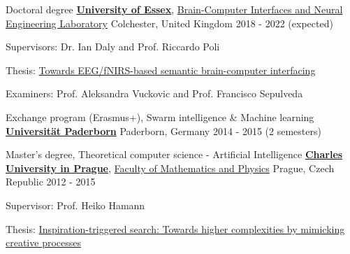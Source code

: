 

\begin{cventries}

  \cventry
    {Doctoral degree} %
    {\href{https://www.essex.ac.uk}{\textbf{University of Essex}}, \href{http://essexbcis.uk}{Brain-Computer Interfaces and Neural Engineering Laboratory}} %
    {Colchester, United Kingdom} %
    {2018 - 2022 (expected)} %
    {
      \begin{cvitems} %
        \item {Supervisors: Dr. Ian Daly and Prof. Riccardo Poli}
        \item {Thesis: \href{http://milanrybar.cz/semantic-brain-computer-interfacing}{Towards EEG/fNIRS-based semantic brain-computer interfacing}}
        \item {Examiners: Prof. Aleksandra Vuckovic and Prof. Francisco Sepulveda}
      \end{cvitems}
    }

  \cventry
{Exchange program (Erasmus+), Swarm intelligence \& Machine learning} %
{\href{http://www.uni-paderborn.de}{\textbf{Universität Paderborn}}} %
{Paderborn, Germany} %
{2014 - 2015 (2 semesters)} %
{
}

  \cventry
{Master's degree, Theoretical computer science - Artificial Intelligence} %
{\href{http://cuni.cz}{\textbf{Charles University in Prague}}, \href{http://www.mff.cuni.cz}
	{Faculty of Mathematics and Physics}} %
{Prague, Czech Republic} %
{2012 - 2015} %
{
	\begin{cvitems} %
		\item {Supervisor: Prof. Heiko Hamann}
		\item {Thesis: \href{http://milanrybar.cz/inspiration-triggered-search}{Inspiration-triggered search: Towards higher complexities by mimicking creative processes}  
		}
	\end{cvitems}
}


\end{cventries}
